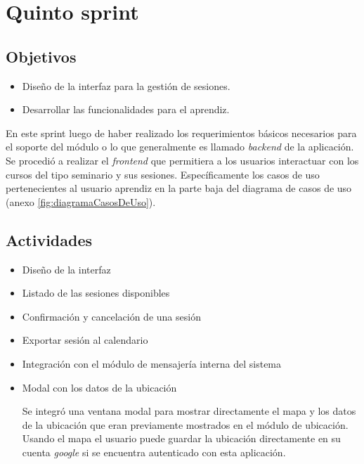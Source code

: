 \section{Quinto sprint} %
\label{sec:quinto_sprint}

\subsection{Objetivos}

\begin{itemize}
	\item Diseño de la interfaz para la gestión de sesiones.
	\item Desarrollar las funcionalidades para el aprendiz.
\end{itemize}

En este sprint luego de haber realizado los requerimientos básicos necesarios para el soporte del módulo o lo que generalmente es llamado \emph{backend} de la aplicación. Se procedió a realizar el \emph{frontend} que permitiera a los usuarios interactuar con los cursos del tipo seminario y sus sesiones. Específicamente los casos de uso pertenecientes al usuario aprendiz en la parte baja del diagrama de casos de uso (anexo \ref{fig:diagramaCasosDeUso}).

\subsection{Actividades} %
\label{sub:actividades5}

\begin{itemize}

\item Diseño de la interfaz
\item Listado de las sesiones disponibles
\item Confirmación y cancelación de una sesión
\item Exportar sesión al calendario
\item Integración con el módulo de mensajería interna del sistema
\item Modal con los datos de la ubicación

	Se integró una ventana modal para mostrar directamente el mapa y los datos de la ubicación que eran previamente mostrados en el módulo de ubicación. Usando el mapa el usuario puede guardar la ubicación directamente en su cuenta \emph{google} si se encuentra autenticado con esta aplicación.

\end{itemize}


